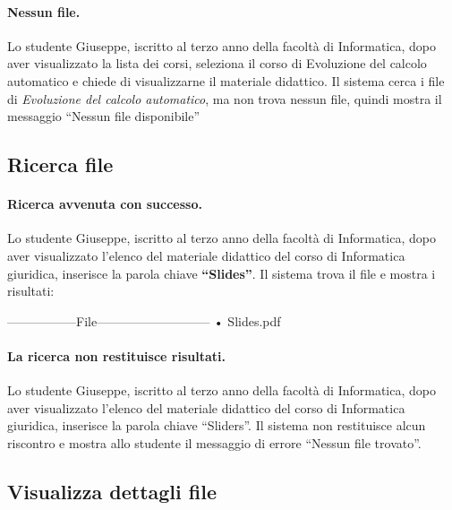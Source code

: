 \paragraph{Nessun file.}
 Lo studente Giuseppe, iscritto al terzo anno della facoltà di Informatica, dopo aver visualizzato la lista dei corsi, seleziona il corso di Evoluzione del calcolo automatico  e chiede di visualizzarne il materiale didattico. Il sistema cerca i file di \textit{Evoluzione del calcolo automatico}, ma non trova nessun file, quindi mostra il messaggio “Nessun file disponibile”
 
\subsection{Ricerca file}
\paragraph{Ricerca avvenuta con successo.}
Lo studente Giuseppe, iscritto al terzo anno della  facoltà di Informatica, dopo aver visualizzato l’elenco del materiale didattico del corso di Informatica giuridica, inserisce la parola chiave \textbf{“Slides”}. Il sistema trova il file e mostra i risultati:   

\begin{tabbing}
	\hspace{1cm}-----------------File---------------------------\kill
	\hspace{1cm} • Slides.pdf  \\
\end{tabbing} 

\paragraph{La ricerca non restituisce risultati.}
Lo studente Giuseppe, iscritto al terzo anno della facoltà di Informatica, dopo aver visualizzato l’elenco del materiale didattico del corso di Informatica giuridica, inserisce la parola chiave “Sliders”. Il sistema non restituisce alcun riscontro e mostra allo studente il messaggio di errore “Nessun file trovato”.

\subsection{ Visualizza dettagli file}
